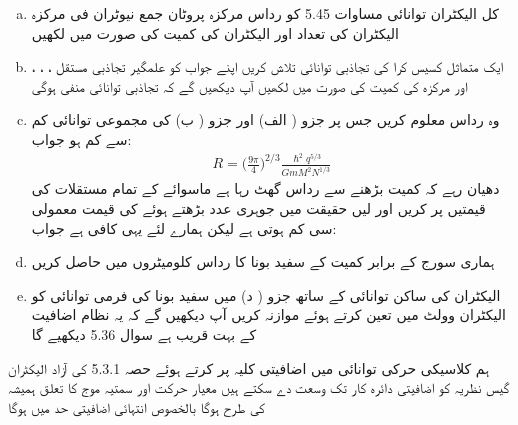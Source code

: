 \begin{enumerate}[a.]
\item
کل الیکٹران توانائی مساوات 5.45 کو رداس مرکزہ پروٹان جمع نیوٹران  فی مرکزہ الیکٹران کی تعداد  اور الیکٹران کی کمیت  کی صورت میں لکھیں 
\item
ایک متماثل کسیس کرا کی تجاذبی توانائی تلاش کریں اپنے جواب کو علمگیر تجاذبی مستقل ، ، ، اور مرکزہ کی کمیت  کی صورت میں لکھیں آپ دیکھیں گے کہ تجاذبی توانائی منفی ہوگی 
\item
وہ رداس معلوم کریں جس پر جزو ( الف) اور جزو ( ب) کی مجموعی توانائی کم سے کم ہو جواب:
\begin{align*}
R = \big ( \frac{9 \pi}{4} \big )^{2/3} \frac{\hslash^2 q^{5/3}}{GmM^2 N^{1/3}}
\end{align*}
دھیان رہے کہ کمیت بڑھنے سے رداس گھٹ رہا ہے ماسوائے  کے تمام مستقلات کی قیمتیں پر کریں اور  لیں حقیقت میں جوہری عدد بڑھتے ہوئے  کی قیمت معمولی سی کم ہوتی ہے لیکن ہمارے لئے یہی کافی ہے جواب:   \item ہماری سورج کے برابر کمیت کے سفید بونا کا رداس کلومیٹروں میں حاصل کریں 
\item
الیکٹران کی ساکن توانائی کے ساتھ جزو ( د) میں سفید بونا کی فرمی توانائی کو الیکٹران وولٹ میں تعین کرتے ہوئے موازنہ کریں آپ دیکھیں گے کہ یہ نظام اضافیت کے بہت قریب ہے سوال 5.36 دیکھیے گا
\end{enumerate}
ہم کلاسیکی حرکی توانائی  میں اضافیتی کلیہ  پر کرتے ہوئے حصہ 5.3.1 کی آزاد الیکٹران گیس نظریہ کو اضافیتی دائرہ کار تک وسعت دے سکتے ہیں معیار حرکت اور سمتیہ موج کا تعلق ہمیشہ کی طرح  ہوگا بالخصوص انتہائی اضافیتی حد میں  ہوگا 
